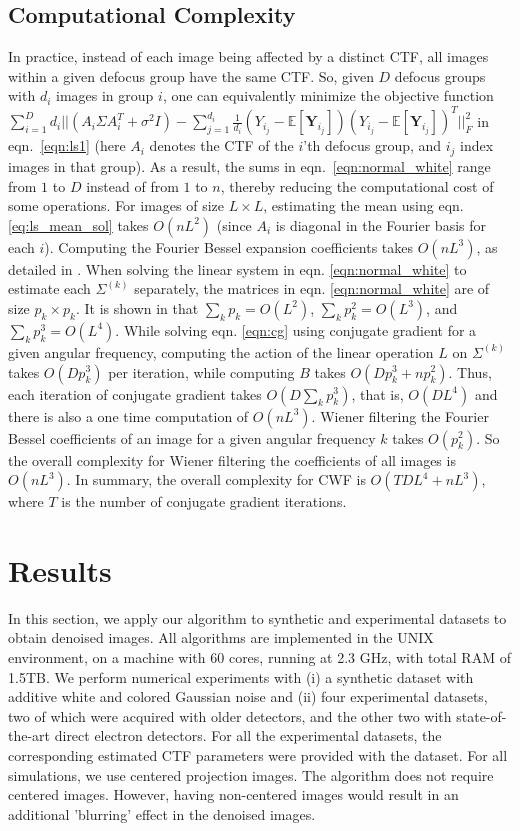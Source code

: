 \subsection{Computational Complexity}
\label{sec:complexity}
In practice, instead of each image being affected by a distinct CTF, all images 
within a given defocus group have the same CTF. So, given $D$ defocus groups 
with $d_i$
images in group $i$, one can equivalently minimize the objective function
 $\sum_{i=1}^D d_i ||(A_i \Sigma A_i^T + \sigma^2 I) -
 \sum_{j=1}^{d_i} \frac{1}{d_i}(Y_{i_j} - \mathbb{E}[\textbf{Y}_{i_j}]) (Y_{i_j} - 
\mathbb{E}[\textbf{Y}_{i_j}])^T
||_F^2 $ in eqn.\ \ref{eqn:ls1} (here $A_i$ denotes the CTF of the $i$'th defocus group, and $i_j$ index images in that group). 
As a result, the sums in eqn.\ \ref{eqn:normal_white} range 
from $1$ to $D$ instead of from $1$ to $n$, thereby reducing the computational cost 
of some operations.
For images of size $L \times L$, estimating the mean using eqn. 
\ref{eq:ls_mean_sol} takes $O(nL^2)$ (since $A_i$ is diagonal
in the Fourier basis for each $i$). Computing the Fourier Bessel expansion 
coefficients takes $O(nL^3)$, as detailed
in \cite{Zhao1, Zhao2016}. When solving the linear system in eqn. \ref{eqn:normal_white}
to estimate each $\Sigma^{(k)}$ separately, the matrices in eqn. 
\ref{eqn:normal_white} are of size $p_k \times p_k$.
It is shown in \cite{Zhao1} that $\sum_k p_k=O(L^2)$, $\sum_k p_k^2=O(L^3)$, 
and $\sum_k p_k^3=O(L^4)$.
While solving eqn. \ref{eqn:cg} using conjugate gradient for a given angular 
frequency, computing the 
action of the linear operation $L$ on $\Sigma^{(k)}$ takes
$O(Dp_k^3)$ per iteration,
while computing $B$ takes $O(Dp_k^3+np_k^2)$. Thus, each iteration of 
conjugate gradient takes
$O(D \sum_k p_k^3)$, that is,
$O(DL^4)$ and there is also a one time computation of $O(nL^3)$.
Wiener filtering the Fourier Bessel coefficients of an image for a given 
angular frequency $k$ takes $O(p_k^2)$. So the overall
complexity for Wiener filtering the coefficients of all images is $O(nL^3)$. 
In summary, the overall complexity for CWF is 
$O(TDL^4 + nL^3)$, where $T$ is the number of conjugate gradient iterations. 


\section{Results}
\label{sec:results}
In this section, we apply our algorithm to synthetic and experimental datasets 
to obtain denoised images. All algorithms are
implemented in the UNIX environment, on a machine with 60 cores,
running at 2.3 GHz, with total RAM of 1.5TB. We perform numerical experiments 
with
(i) a synthetic dataset with additive white and colored Gaussian noise and (ii) 
four experimental
datasets, two of which were acquired with older detectors, and the other two 
with state-of-the-art
direct electron detectors. For all the experimental datasets, the corresponding
estimated CTF parameters were provided with the dataset. For all simulations,
we use centered projection images. The algorithm does not require centered images. 
However, having non-centered images would result in an additional
'blurring' effect in the denoised images.


